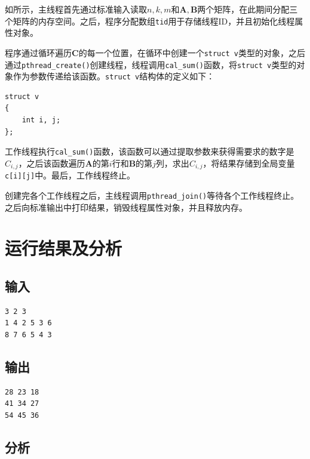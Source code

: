 \documentclass[lang=cn,11pt,a4paper,cite=authornum]{paper}
\begin{document}
如所示，主线程首先通过标准输入读取$n,k,m$和$\mathbf A,\mathbf B$两个矩阵，在此期间分配三个矩阵的内存空间。之后，程序分配数组\texttt{tid}用于存储线程ID，并且初始化线程属性对象。

程序通过循环遍历$\mathbf C$的每一个位置，在循环中创建一个\texttt{struct v}类型的对象，之后通过\texttt{pthread_create()}创建线程，线程调用\texttt{cal_sum()}函数，将\texttt{struct v}类型的对象作为参数传递给该函数。\texttt{struct v}结构体的定义如下：

\begin{code}
\begin{verbatim}
struct v
{
    int i, j;
};
\end{verbatim}
\end{code}

工作线程执行\texttt{cal_sum()}函数，该函数可以通过提取参数来获得需要求的数字是$C_{i,j}$，之后该函数遍历$\mathbf A$的第$i$行和$\mathbf B$的第$j$列，求出$C_{i,j}$，将结果存储到全局变量\texttt{c[i][j]}中。最后，工作线程终止。

创建完各个工作线程之后，主线程调用\texttt{pthread_join()}等待各个工作线程终止。之后向标准输出中打印结果，销毁线程属性对象，并且释放内存。

\section{运行结果及分析}

\subsection{输入}

\begin{code}
\begin{verbatim}
3 2 3
1 4 2 5 3 6
8 7 6 5 4 3
\end{verbatim}
\end{code}

\subsection{输出}

\begin{code}
\begin{verbatim}
28 23 18 
41 34 27 
54 45 36
\end{verbatim}
\end{code}

\subsection{分析}
\end{document}
